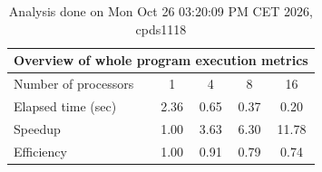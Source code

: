 \begin{table}[h]
\begin{center}
\begin{tabular}{|l|c|c|c|c|}
\hline
\multicolumn{5}{|c|}{Overview of whole program execution metrics} \\
\hline
\hline
Number of processors & 1 & 4 & 8 & 16 \\
\hline
Elapsed time (sec)      &       2.36 &       0.65 &       0.37 &       0.20 \\
\hline
Speedup                 &       1.00 &       3.63 &       6.30 &      11.78 \\
\hline
Efficiency              &       1.00 &       0.91 &       0.79 &       0.74 \\
\hline
\end{tabular}
\end{center}
\caption{ Analysis done on Mon Oct 26 03:20:09 PM CET 2026, cpds1118}
\end{table}
